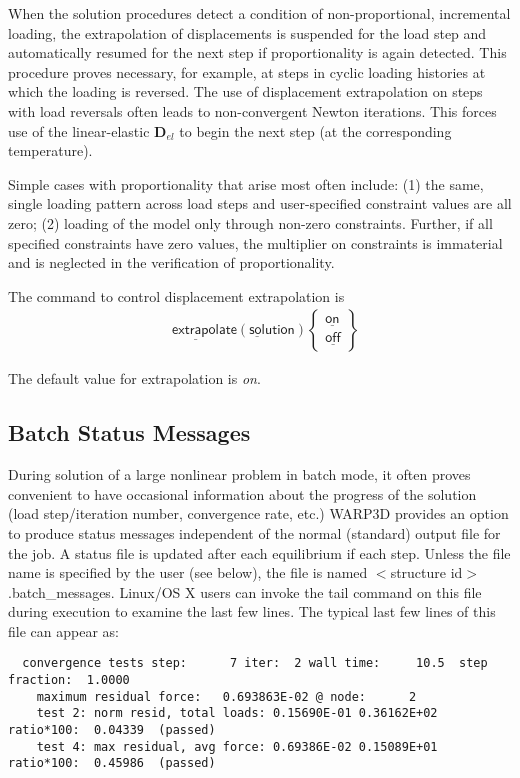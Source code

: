 \documentclass[11pt]{report}
\numberwithin{equation}{section}
\newcommand{\nin} {\noindent}
\newcommand{\ul} {\underline}
\newcommand{\hv} {\mathsf}   %
\newcommand{\ti}{\emph}
\begin{document}
When the solution procedures detect a condition of non-proportional, incremental
loading, the extrapolation of displacements is suspended for the load step and
automatically resumed for the next step if proportionality is again
detected. This procedure proves necessary, for example, at steps in
cyclic loading histories at which the loading is reversed. The use of 
displacement extrapolation on steps
with load reversals often leads to non-convergent Newton iterations. 
This forces use of the linear-elastic $\mathbf{D}_{el}$ to begin the next step
(at the corresponding temperature).

Simple cases with proportionality that arise most often 
include: (1) the same, single loading pattern 
across load steps and user-specified constraint values are all zero; (2) loading of  the
model only through non-zero constraints. Further, if all specified constraints
have zero values, the multiplier on constraints is immaterial and is neglected in the
verification of proportionality. 



The command to control displacement extrapolation is
\begin{align*}
&\hv{\ul{extrapol}ate (\ul{sol}ution) }
\begin{Bmatrix}
\hv{\ul{on}}\\ \hv{\ul{off}}
\end{Bmatrix}
\end{align*}

\nin The default value for extrapolation is \ti{on}.

 
\subsection{Batch Status Messages}
\nin During solution of a large nonlinear problem in batch mode, it often proves convenient to 
have occasional information about the progress of the solution (load step/iteration number, 
convergence rate, etc.) WARP3D provides an option to produce status messages 
independent of the normal (standard) output file for the job. A status file is 
updated after each equilibrium if each step. Unless the file name is specified by the user
(see below),  the file is named 
$<$structure id$>$.batch\_messages. Linux/OS X users can invoke the tail 
command on this file during execution to examine the 
last few lines. The typical last few lines of this file can appear as:

\footnotesize
\begin{verbatim}
  convergence tests step:      7 iter:  2 wall time:     10.5  step fraction:  1.0000
    maximum residual force:   0.693863E-02 @ node:      2
    test 2: norm resid, total loads: 0.15690E-01 0.36162E+02 ratio*100:  0.04339  (passed)
    test 4: max residual, avg force: 0.69386E-02 0.15089E+01 ratio*100:  0.45986  (passed)
\end{verbatim} 
\normalsize
\end{document}
